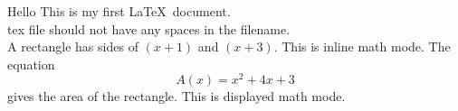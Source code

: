\documentclass[11pt]{article}
\begin{document}
Hello This is my first \LaTeX\ document.\\
tex file should not have any spaces in the filename.\\
A rectangle has sides of $(x+1)$ and $(x+3)$. This is inline math mode.
The equation $${A(x)=x^2+4x+3}$$ gives the area of the rectangle. This is displayed math mode.
\end{document}
